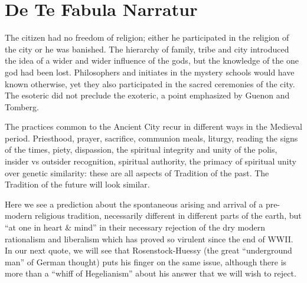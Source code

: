 \section{De Te Fabula Narratur}

\begin{quotationx}
The citizen had no freedom of religion; either he participated in the religion of the city or he was banished. The hierarchy of family, tribe and city introduced the idea of a wider and wider influence of the gods, but the knowledge of the one god had been lost. Philosophers and initiates in the mystery schools would have known otherwise, yet they also participated in the sacred ceremonies of the city. The esoteric did not preclude the exoteric, a point emphasized by Guenon and Tomberg.

The practices common to the Ancient City recur in different ways in the Medieval period. Priesthood, prayer, sacrifice, communion meals, liturgy, reading the signs of the times, piety, dispassion, the spiritual integrity and unity of the polis, insider vs outsider recognition, spiritual authority, the primacy of spiritual unity over genetic similarity: these are all aspects of Tradition of the past. The Tradition of the future will look similar.
\end{quotationx}

Here we see a prediction about the spontaneous arising and arrival of a pre-modern religious tradition, necessarily different in different parts of the earth, but ``at one in heart \& mind'' in their necessary rejection of the dry modern rationalism and liberalism which has proved so virulent since the end of WWII. In our next quote, we will see that Rosenstock-Huessy (the great ``underground man'' of German thought) puts his finger on the same issue, although there is more than a ``whiff of Hegelianism'' about his answer that we will wish to reject.


